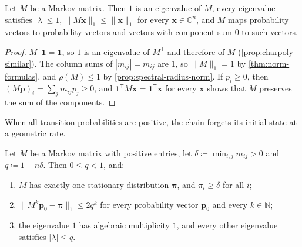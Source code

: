 \begin{proposition}
\label{prop:markov-basic}
Let $M$ be a Markov matrix. Then $1$ is an eigenvalue of $M$, every eigenvalue satisfies $|\lambda|\le1$, $\|M\mathbf x\|_1\le\|\mathbf x\|_1$ for every $\mathbf x\in\mathbb C^n$, and $M$ maps probability vectors to probability vectors and vectors with component sum $0$ to such vectors.
\end{proposition}

\begin{proof}
$M^{\mathsf T}\mathbf 1=\mathbf 1$, so $1$ is an eigenvalue of $M^{\mathsf T}$ and therefore of $M$ (\cref{prop:charpoly-similar}). The column sums of $|m_{ij}|=m_{ij}$ are $1$, so $\|M\|_1=1$ by \cref{thm:norm-formulas}, and $\rho(M)\le1$ by \cref{prop:spectral-radius-norm}. If $p_i\ge0$, then $(M\mathbf p)_i=\sum_jm_{ij}p_j\ge0$, and $\mathbf 1^{\mathsf T}M\mathbf x=\mathbf 1^{\mathsf T}\mathbf x$ for every $\mathbf x$ shows that $M$ preserves the sum of the components.
\end{proof}

When all transition probabilities are positive, the chain forgets its initial state at a geometric rate.

\begin{theorem}
\label{thm:perron-positive}
Let $M$ be a Markov matrix with positive entries, let $\delta\coloneqq\min_{i,j}m_{ij}>0$ and $q\coloneqq1-n\delta$. Then $0\le q<1$, and:
\begin{enumerate}
\item $M$ has exactly one stationary distribution $\boldsymbol\pi$, and $\pi_i\ge\delta$ for all $i$;
\item $\|M^k\mathbf p_0-\boldsymbol\pi\|_1\le2q^k$ for every probability vector $\mathbf p_0$ and every $k\in\mathbb N$;
\item the eigenvalue $1$ has algebraic multiplicity $1$, and every other eigenvalue satisfies $|\lambda|\le q$.
\end{enumerate}
\end{theorem}

